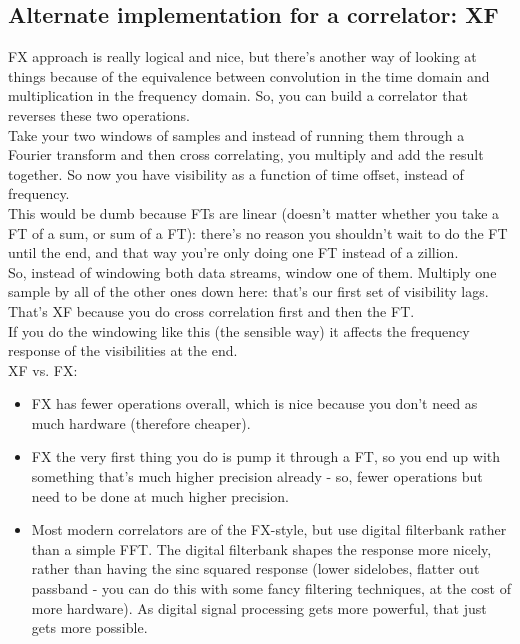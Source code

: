 \documentclass[a4paper]{article}
\begin{document}
\subsection{Alternate implementation for a correlator: XF}

FX approach is really logical and nice, but there's another way of looking at things because of the equivalence between convolution in the time domain and multiplication in the frequency domain. So, you can build a correlator that reverses these two operations. \\

Take your two windows of samples and instead of running them through a Fourier transform and then cross correlating, you multiply and add the result together. So now you have visibility as a function of time offset, instead of frequency. \\

This would be dumb because FTs are linear (doesn't matter whether you take a FT of a sum, or sum of a FT): there's no reason you shouldn't wait to do the FT until the end, and that way you're only doing one FT instead of a zillion. \\

So, instead of windowing both data streams, window one of them. Multiply one sample by all of the other ones down here: that's our first set of visibility lags. That's XF because you do cross correlation first and then the FT. \\

If you do the windowing like this (the sensible way) it affects the frequency response of the visibilities at the end. \\

XF vs. FX:

\begin{itemize}

\item FX has fewer operations overall, which is nice because you don't need as much hardware (therefore cheaper). 

\item FX the very first thing you do is pump it through a FT, so you end up with something that's much higher precision already - so, fewer operations but need to be done at much higher precision. 

\item Most modern correlators are of the FX-style, but use digital filterbank rather than a simple FFT. The digital filterbank shapes the response more nicely, rather than having the sinc squared response (lower sidelobes, flatter out passband - you can do this with some fancy filtering techniques, at the cost of more hardware). As digital signal processing gets more powerful, that just gets more possible.

\end{itemize}
\end{document}
